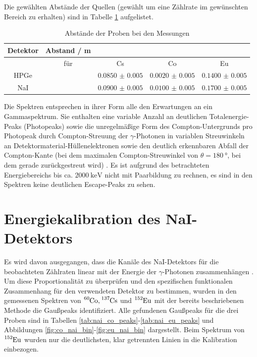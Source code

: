 Die gewählten Abstände der Quellen (gewählt um eine Zählrate im gewünschten Bereich zu erhalten) sind in Tabelle \ref{tab:distance} aufgelistet.

\begin{table}[h]
    \centering
    \begin{tabular}{|c||c|c|c|c|} \hline
    Detektor & Abstand / m & & & \\ \hline
	& für & Cs & Co & Eu \\
	\hline \hline
	HPGe & & $\num{0.0850(50)}$ & $\num{0.0020(50)}$ & $\num{0.1400(50)}$ \\
	NaI & & $\num{0.0900(50)}$ & $\num{0.0100(50)}$ & $\num{0.1700(50)}$ \\
	\hline
    \end{tabular}
    \caption{Abstände der Proben bei den Messungen}
    \label{tab:distance}
\end{table}

Die Spektren entsprechen in ihrer Form alle den Erwartungen an ein Gammaspektrum. Sie enthalten eine variable Anzahl an deutlichen Totalenergie-Peaks (Photopeaks) sowie die unregelmäßige Form des Compton-Untergrunds pro Photopeak durch Compton-Streuung der $\gamma$-Photonen in variablen Streuwinkeln an Detektormaterial-Hüllenelektronen sowie den deutlich erkennbaren Abfall der Compton-Kante (bei dem maximalen Compton-Streuwinkel von $\theta=\SI{180}{\degree}$, bei dem gerade zurückgestreut wird) \cite[526-531]{gammahandbook}. Es ist aufgrund des betrachteten Energiebereichs bis ca. $\SI{2000}{\kilo\eV}$ nicht mit Paarbildung zu rechnen, es sind in den Spektren keine deutlichen Escape-Peaks zu sehen.

\section{Energiekalibration des NaI-Detektors}\label{sec:nai_cal}

Es wird davon ausgegangen, dass die Kanäle des NaI-Detektors für die beobachteten Zählraten linear mit der Energie der $\gamma$-Photonen zusammenhängen \cite[5]{521versuchsanleitung}. Um diese Proportionalität zu überprüfen und den spezifischen funktionalen Zusammenhang für den verwendeten Detektor zu bestimmen, wurden in den gemessenen Spektren von $\ce{^60Co}, \ce{^137Cs}$ und $\ce{^152Eu}$ mit der bereits beschriebenen Methode die Gaußpeaks identifiziert. Alle gefundenen Gaußpeaks für die drei Proben sind in Tabellen \ref{tab:nai_co_peaks}-\ref{tab:nai_eu_peaks} und Abbildungen \ref{fig:co_nai_bin}-\ref{fig:eu_nai_bin} dargestellt. Beim Spektrum von $\ce{^152Eu}$ wurden nur die deutlichsten, klar getrennten Linien in die Kalibration einbezogen.

